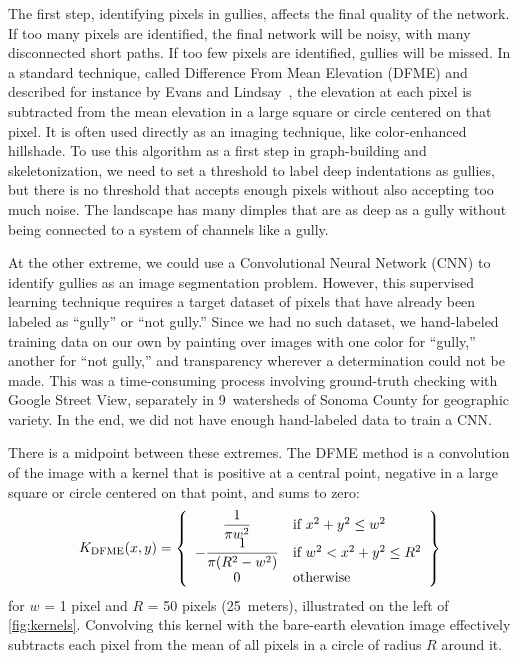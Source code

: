 The first step, identifying pixels in gullies, affects the final quality of the network. If too many pixels are identified, the final network will be noisy, with many disconnected short paths. If too few pixels are identified, gullies will be missed. In a standard technique, called Difference From Mean Elevation (DFME) and described for instance by Evans and Lindsay~\citep{evans2010}, the elevation at each pixel is subtracted from the mean elevation in a large square or circle centered on that pixel. It is often used directly as an imaging technique, like color-enhanced hillshade. To use this algorithm as a first step in graph-building and skeletonization, we need to set a threshold to label deep indentations as gullies, but there is no threshold that accepts enough pixels without also accepting too much noise. The landscape has many dimples that are as deep as a gully without being connected to a system of channels like a gully.

At the other extreme, we could use a Convolutional Neural Network (CNN) to identify gullies as an image segmentation problem. However, this supervised learning technique requires a target dataset of pixels that have already been labeled as ``gully'' or ``not gully.'' Since we had no such dataset, we hand-labeled training data on our own by painting over images with one color for ``gully,'' another for ``not gully,'' and transparency wherever a determination could not be made. This was a time-consuming process involving ground-truth checking with Google Street View, separately in 9~watersheds of Sonoma County for geographic variety. In the end, we did not have enough hand-labeled data to train a CNN.

There is a midpoint between these extremes. The DFME method is a convolution of the image with a kernel that is positive at a central point, negative in a large square or circle centered on that point, and sums to zero:
\[
K_{\mathrm{DFME}}(x,y)=
\left\{\begin{array}{c l}
\dfrac{1}{\pi w^2} & \textrm{if } x^2+y^2\le w^2 \\
-\dfrac{1}{\pi(R^2-w^2)} & \textrm{if } w^2<x^2+y^2\le R^2 \\
0 & \textrm{otherwise}
\end{array}\right\}
\]
for $w$ = 1 pixel and $R$ = 50 pixels (25~meters), illustrated on the left of \cref{fig:kernels}. Convolving this kernel with the bare-earth elevation image effectively subtracts each pixel from the mean of all pixels in a circle of radius $R$ around it.

